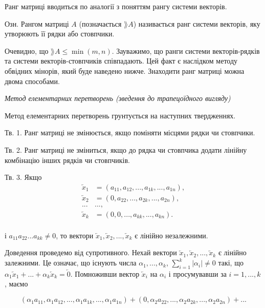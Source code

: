 Ранг матриці вводиться по аналогії з поняттям рангу системи векторів.

Озн. Рангом матриці $A$ (позначається $\rang A$) називається ранг системи
векторів, яку утворюють її рядки або стовпчики.

Очевидно, що $\rang A \leqslant \min(m,n)$. Зауважимо, що ранги системи векторів-рядків
та системи векторів-стовпчиків співпадають. Цей факт є наслідком методу
обвідних мінорів, який буде наведено нижче. Знаходити ранг матриці можна двома
способами.

\textit{Метод елементарних перетворень (зведення до трапецоїдного вигляду)}

Метод елементарних перетворень грунтується на наступних твердженнях.


Тв. 1. Ранг матриці не змінюється, якщо поміняти місцями рядки чи
стовпчики.


Тв. 2. Ранг матриці не зміниться, якщо до рядка чи стовпчика додати лінійну
комбінацію інших рядків чи стовпчиків.


Тв. 3. Якщо
\begin{equation*}
    \begin{split}
        \overleftarrow{x}_1 & = (a_{11}, a_{12}, ..., a_{1k}, ..., a_{1n}),\\
        \overleftarrow{x}_2 & = (0, a_{22}, ..., a_{2k}, ..., a_{2n}),\\
        ... & ...,\\
        \overleftarrow{x}_k & = (0, 0, ..., a_{kk}, ..., a_{kn}).\\
    \end{split}
\end{equation*}

і $a_{11} a_{22} ... a_{kk} \neq 0$, то
вектори $\overleftarrow{x}_1, \overleftarrow{x}_2, ..., \overleftarrow{x}_k$ є лінійно
незалежними.


Доведення проведемо від супротивного. Нехай вектори $\overleftarrow{x}_1, \overleftarrow{x}_2, ..., \overleftarrow{x}_k$ є лінійно
залежними. Це означає, що існують числа $\alpha_1, ..., \alpha_k$, $\sum\limits_{i=1}^k |\alpha_i| \neq 0$
такі, що $\alpha_1 \overleftarrow{x}_1 + ... + \alpha_k \overleftarrow{x}_k = \overleftarrow{0}$.
Помноживши вектор $\overleftarrow{x}_i$ на $\alpha_i$ і просумувавши за $i = 1, ..., k$,
маємо

$$(\alpha_1 a_{11}, \alpha_1 a_{12}, ..., \alpha_1 a_{1k}, ..., \alpha_1 a_{1n})
	+ (0, \alpha_2 a_{22}, ..., \alpha_2 a_{2k}, ..., \alpha_2 a_{2n}) + ...$$

